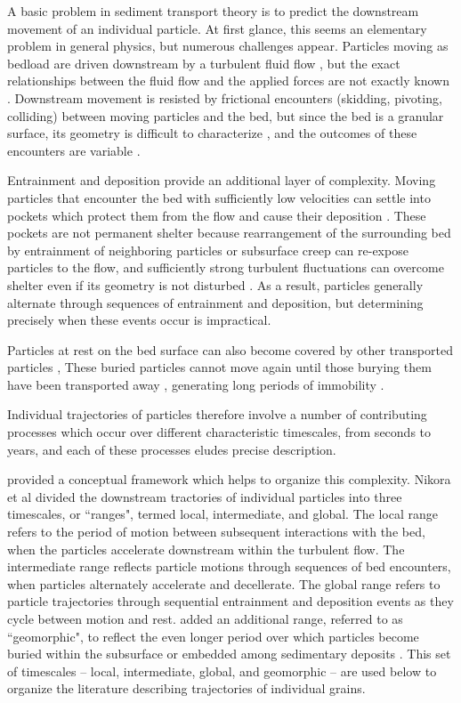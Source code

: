 A basic problem in sediment transport theory is to predict the downstream movement of an individual particle.
At first glance, this seems an elementary problem in general physics, but numerous challenges appear.
Particles moving as bedload are driven downstream by a turbulent fluid flow \citep{}, but the exact relationships between the fluid flow and the applied forces are not exactly known \citep{Furbish1997}.
Downstream movement is resisted by frictional encounters (skidding, pivoting, colliding) between moving particles and the bed, but since the bed is a granular surface, its geometry is difficult to characterize \citep{Gordon1972}, and the outcomes of these encounters are variable \citep{Sekine1992}.

Entrainment and deposition provide an additional layer of complexity.
Moving particles that encounter the bed with sufficiently low velocities can settle into pockets which protect them from the flow \citep{Miller1966} and cause their deposition \citep{Charru2004}.
These pockets are not permanent shelter because rearrangement of the surrounding bed by entrainment of neighboring particles or subsurface creep \citep{Houssais2016,Frey2014} can re-expose particles to the flow, and sufficiently strong turbulent fluctuations \citep{Cameron2020} can overcome shelter even if its geometry is not disturbed \citep{Valyrakis2012,Celik2014}. 
As a result, particles generally alternate through sequences of entrainment and deposition, but determining precisely when these events occur is impractical.

Particles at rest on the bed surface can also become covered by other transported particles \citep{Yang1972}, 
These buried particles cannot move again until those burying them have been transported away \citep{Nakagawa1981}, generating long periods of immobility \citep{Church1994,Ferguson2002}.

Individual trajectories of particles therefore involve a number of contributing processes which occur over different characteristic timescales, from seconds to years, and each of these processes eludes precise description.

\citet{Nikora2001,Nikora2002} provided a conceptual framework which helps to organize this complexity.
Nikora et al divided the downstream tractories of individual particles into three timescales, or ``ranges", termed local, intermediate, and global.
The local range refers to the period of motion between subsequent interactions with the bed, when the particles accelerate downstream within the turbulent flow.
The intermediate range reflects particle motions through sequences of bed encounters, when particles alternately accelerate and decellerate. 
The global range refers to particle trajectories through sequential entrainment and deposition events as they cycle between motion and rest.
\citet{Hassan2017} added an additional range, referred to as ``geomorphic", to reflect the even longer period over which particles become buried within the subsurface or embedded among sedimentary deposits \citep{Bradley2017,Pretzslav2021}.
This set of timescales -- local, intermediate, global, and geomorphic -- are used below to organize the literature describing trajectories of individual grains.

